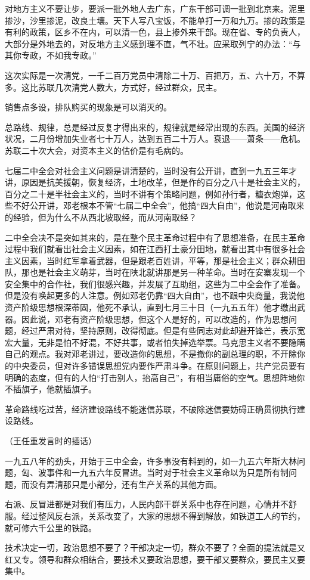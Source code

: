 对地方主义不要让步，要派一批外地人去广东，广东干部可调一批到北京来。泥里掺沙，沙里掺泥，改良土壤。天下人写八宝饭，不能单打一万和九万。掺的政策是有利的政策，区乡不在内，可以清一色，县上掺外来干部。现在省、专的负责人，大部分是外地去的，对反地方主义感到理不直，气不壮。应采取列宁的办法：“与其你专政，不如我专政。”

这次实际是一次清党，一千二百万党员中清除二十万、百把万，五、六十万，不算多。这比苏联几次清党人数大，方式好，经过群众，民主。

销售点多设，排队购买的现象是可以消灭的。

总路线、规律，总是经过反复才得出来的，规律就是经常出现的东西。美国的经济状况，二月份增加失业者七十万人，达到五百二十万人。衰退——萧条——危机。苏联二十次大会，对资本主义的估价是有毛病的。

七届二中全会对社会主义问题是讲清楚的，当时没有公开讲，直到一九五三年才讲，原因是抗美援朝，恢复经济，土地改革，但是作的百分之八十是社会主义的，百分之二十是半社会主义的，当时不讲有个策略问题，例如孙行者，糖衣炮弹，这些不好公开讲，邓老根本不管“七届二中全会”，他搞“四大自由”，他说是河南取来的经验，但为什么不从西北坡取经，而从河南取经？

二中全会决不是突如其来的，是在整个民主革命过程中有了思想准备，在民主革命过程中我们就看出社会主义因素，如在江西打土豪分田地，就看出其中有很多社会主义因素，当时红军拿着武器，但是跟老百姓讲，平等，那是社会主义；群众耕田队，那也是社会主义萌芽，当时在陕北就讲那是另一种革命。当时在安寨发现一个安全集中的合作社，我们很感兴趣，并发展了互助组，这些为二中全会作了准备。但是没有唤起更多的人注意。例如邓老仍靠“四大自由”，也不跟中央商量，我说他资产阶级思想根深蒂固，他死不承认，直到七月三十日（一九五五年）他才缴出武器。因此说，邓老有资产阶级思想，但这个人是好的，可以改造的，作为思想问题，经过严肃对待，坚持原则，改得彻底。但是有些同志对此却避开锋芒，表示宽宏大量，无非是怕不好混，不好共事，或者怕失掉选举票。马克思主义者不要隐瞒自己的观点。我对邓老讲过，要改造你的思想，不是撤你的副总理的职，不开除你的中央委员，但对许多错误思想党内要作严肃斗争。在原则问题上，共产党员要有明确的态度，但有的人怕“打击别人，抬高自己”，有相当庸俗的空气。思想阵地你不插旗子，他就插旗子。

革命路线吃过苦，经济建设路线不能迷信苏联，不破除迷信要妨碍正确贯彻执行建设路线。

（王任重发言时的插话）

一九五八年的劲头，开始于三中全会，许多事没有料到的，如一九五六年斯大林问题，匈、波事件和一九五六年反冒进。当时对于社会主义革命以为只是所有制问题，而没有弄清那只是小部分，还有生产关系的其他方面。

右派、反冒进都是对我们有压力，人民内部干群关系中也存在问题，心情并不舒服。经过整风反右派，关系改变了，大家的思想不得到解放，如铁道工人的节约，就可修六千公里的铁路。

技术决定一切，政治思想不要了？干部决定一切，群众不要了？全面的提法就是又红又专。领导和群众相结合，要技术又要政治思想，要干部又要群众，要民主又要集中。

